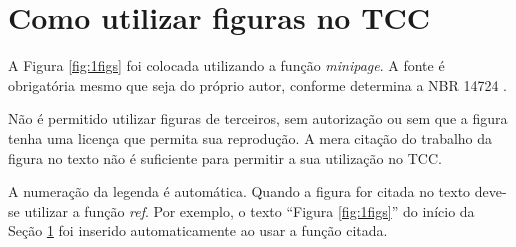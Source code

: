 \documentclass[
        oneside,      %
        english,			
        brazil			 
        ]{configcefetmglpd}
\begin{document}
\section{Como utilizar figuras no TCC} \label{sec:figuras_tcc}
A Figura \ref{fig:1figs} foi colocada utilizando a função \textit{minipage}. A fonte é obrigatória mesmo que seja do próprio autor, conforme determina a NBR 14724 \cite{bib:abnt14724}. 

Não é permitido utilizar figuras de terceiros, sem autorização ou sem que a figura tenha uma licença que permita sua reprodução. A mera citação do trabalho da figura no texto não é suficiente para permitir a sua utilização no TCC.

A numeração da legenda é automática. Quando a figura for citada no texto deve-se utilizar a função \textit{ref}. Por exemplo, o texto “Figura \ref{fig:1figs}” do início da Seção \ref{sec:figuras_tcc} foi inserido automaticamente ao usar a função citada.
\end{document}
